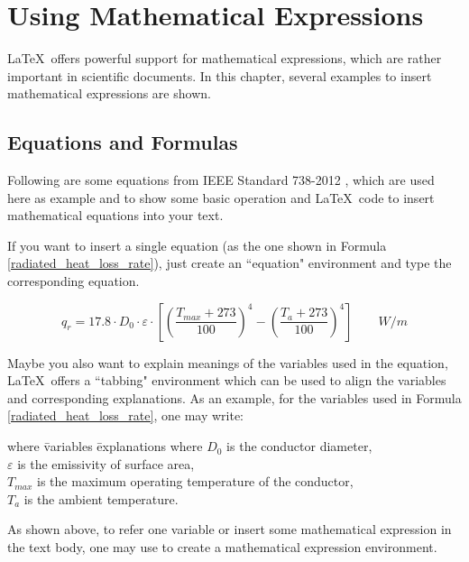 \chapter{Using Mathematical Expressions}

\graphicspath{ {graphics/Chapter2/} }

\LaTeX~offers powerful support for mathematical expressions, which are rather important in scientific documents. In this chapter, several examples to insert mathematical expressions are shown.

\section{Equations and Formulas}
	
	Following are some equations from IEEE Standard 738-2012 \cite{IEEEPower&EnergySociety.2013}, which are used here as example and to show some basic operation and \LaTeX~code to insert mathematical equations into your text. 
	
	If you want to insert a single equation (as the one shown in Formula \ref{radiated_heat_loss_rate}), just create an ``equation" environment and type the corresponding equation.
	
	\begin{equation}
		q_r = 17.8 {\cdot} D_0 {\cdot} {\varepsilon} {\cdot}\left[
		\left( \frac{T_{max}{+}273}{100} \right)^4 - \left( \frac{T_a{+}273}{100} \right)^4
		\right] \qquad W/m
		\label{radiated_heat_loss_rate}
	\end{equation}
	
	Maybe you also want to explain meanings of the variables used in the equation, \LaTeX~offers a ``tabbing" environment which can be used to align the variables and corresponding explanations. As an example, for the variables used in Formula \ref{radiated_heat_loss_rate}, one may write:
	
	\begin{tabbing}
		where \hspace{0.3cm} \= variables  \= explanations \kill
		where \> {$D_0$} \> is the conductor diameter, \\
		\> {$\varepsilon$} \> is the emissivity of surface area, \\
		\> {$T_{max}$} \> is the maximum operating temperature of the conductor, \\
		\> {$T_a$} \> is the ambient temperature.
	\end{tabbing}
	
	As shown above, to refer one variable or insert some mathematical expression in the text body, one may use {\color{blue}{\verb|{$ $}|}} to create a mathematical expression environment.
	
